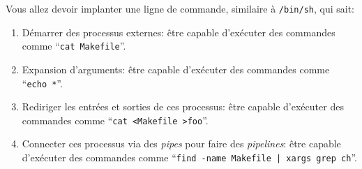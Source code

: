 \documentclass{article}
\begin{document}
Vous allez devoir implanter une ligne de commande, similaire
à \texttt{/bin/sh}, qui sait:
\begin{enumerate}
\item Démarrer des processus externes: être capable d'exécuter des commandes
  comme ``\texttt{cat Makefile}''.
\item Expansion d'arguments: être capable d'exécuter des commandes comme
  ``\texttt{echo *}''.
\item Rediriger les entrées et sorties de ces processus: être capable
  d'exécuter des commandes comme ``\texttt{cat <Makefile >foo}''.
\item Connecter ces processus via des \emph{pipes} pour faire des
  \emph{pipelines}: être capable d'exécuter des commandes comme
  ``\texttt{find -name Makefile | xargs grep ch}''.
\end{enumerate}
\end{document}
